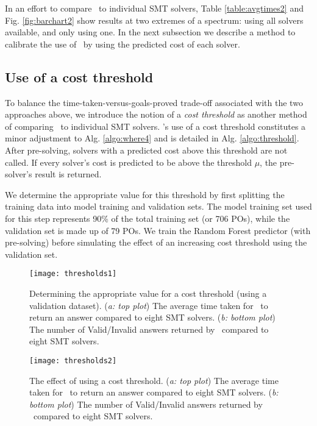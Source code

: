 In an effort to compare \where~to individual SMT solvers, Table \ref{table:avgtimes2} and Fig. \ref{fig:barchart2} show results at two extremes of a spectrum: using all solvers available, and only using one.
In the next subsection we describe a method to calibrate the use of \where~by using the predicted cost of each solver. 


\subsection{Use of a cost threshold}
\label{sub:threshold}

To balance the time-taken-versus-goals-proved trade-off associated with the two approaches above, we introduce the notion of a \textit{cost threshold} as another method of comparing \where~to individual SMT solvers.
\where's use of a cost threshold constitutes a minor adjustment to Alg. \ref{algo:where4} and is detailed in Alg. \ref{algo:threshold}. 
After pre-solving, solvers with a predicted cost above this threshold are not called. 
If every solver's cost is predicted to be above the threshold $\mu$, the pre-solver's result is returned.

We determine the appropriate value for this threshold by first splitting the training data into model training and validation sets.
The model training set used for this step represents 90\% of the total training set (or 706 POs), while the validation set is made up of 79 POs. 
We train the Random Forest predictor (with pre-solving) before simulating the effect of an increasing cost threshold using the validation set.

\begin{figure}
	\centering
	\texttt{[image: thresholds1]}
	\caption[Determining a cost threshold]{Determining the appropriate value for a cost threshold (using a validation dataset). (\textit{a: top plot}) The average time taken for \where~to return an answer compared to eight SMT solvers. (\textit{b: bottom plot}) The number of Valid/Invalid answers returned by \where~compared to eight SMT solvers.}
	\label{fig:thresholds1}
\end{figure}  


\begin{figure}
	\centering
	\texttt{[image: thresholds2]}
	\caption[The effect of using a cost threshold]{The effect of using a cost threshold. (\textit{a: top plot}) The average time taken for \where~to return an answer compared to eight SMT solvers. (\textit{b: bottom plot}) The number of Valid/Invalid answers returned by \where~compared to eight SMT solvers.}
	\label{fig:thresholds2}
\end{figure}



